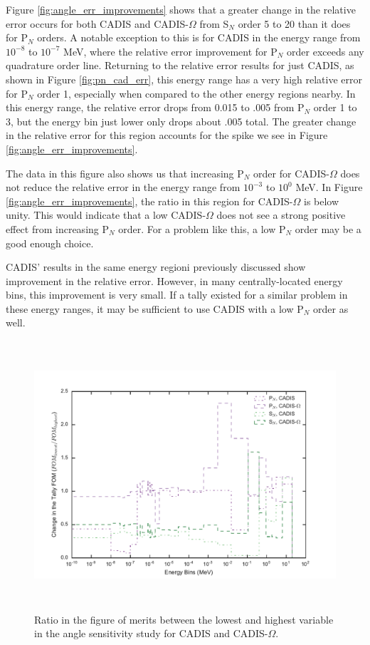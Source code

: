 Figure \ref{fig:angle_err_improvements} shows that a greater change in the
relative error occurs for both CADIS and CADIS-$\Omega$ from S$_N$ order 5 to 20
than it does for P$_N$ orders. A notable exception to this is for CADIS in the
energy range from $10^{-8}$ to $10^{-7}$ MeV, where the relative error
improvement for P$_N$ order exceeds any quadrature order line. Returning to
the relative error results for just CADIS, as shown in Figure
\ref{fig:pn_cad_err}, this energy range has a very high relative error for P$_N$
order 1, especially when compared to the other energy regions nearby. In this
energy range, the relative error drops from 0.015 to .005 from P$_N$ order 1 to
3, but the energy bin just lower only drops about .005 total. The greater change
in the relative error for this region accounts for the spike we see in Figure
\ref{fig:angle_err_improvements}.

The data in this figure also shows us that increasing P$_N$ order for
CADIS-$\Omega$ does not reduce the relative error in the energy range from
$10^{-3}$ to $10^{0}$ MeV. In Figure \ref{fig:angle_err_improvements}, the ratio
in this region for CADIS-$\Omega$ is below unity. This would indicate that a low
CADIS-$\Omega$ does not see a strong positive effect from increasing P$_N$
order. For a problem like this, a low P$_N$ order may be a good enough choice.

CADIS' results in the same energy regioni previously discussed show improvement in the
relative error. However, in many centrally-located energy bins, this improvement
is very small. If a tally existed for a similar problem in these energy ranges,
it may be sufficient to use CADIS with a low P$_N$ order as well.

\begin{figure}[h!]
  \centering
  \includegraphics[height=10cm]{./chapters/characterization_probs/figures/angle/prob_1/improvement_fom_allmethds.pdf}
  \caption[Ratio in the figure of merits between the lowest and highest variable in the angle
  sensitivity study for CADIS and CADIS-$\Omega$.]{Ratio in the figure of merits between
    the lowest and highest variable in the angle sensitivity study for CADIS and CADIS-$\Omega$.}
  \label{fig:angle_fom_improvements}
\end{figure}

